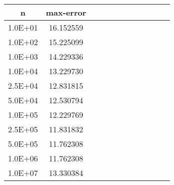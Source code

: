 \begin{tabular}{|c|c|c|c|c|c|c|c|c|c|c|c|}
	\hline
	n&max-error\\
	\hline
	1.0E+01&16.152559\\
	\hline
	1.0E+02&15.225099\\
	\hline
	1.0E+03&14.229336\\
	\hline
	1.0E+04&13.229730\\
	\hline
	2.5E+04&12.831815\\
	\hline
	5.0E+04&12.530794\\
	\hline
	1.0E+05&12.229769\\
	\hline
	2.5E+05&11.831832\\
	\hline
	5.0E+05&11.762308\\
	\hline
	1.0E+06&11.762308\\
	\hline
	1.0E+07&13.330384\\
\hline
\end{tabular}